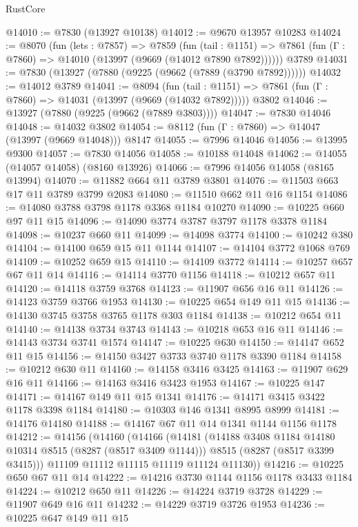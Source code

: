 \begin{lexlean}{RustCore}
\begin{coremodule}
@14010 := @7830 (@13927 @10138)
@14012 := @9670 @13957 @10283
@14024 := @8070
    (fun (lets : @7857) =>
    @7859
      (fun (tail : @1151) =>
      @7861 (fun (Γ : @7860) => @14010 (@13997 (@9669 (@14012 @7890 @7892))))))
    @3789
@14031 := @7830 (@13927 (@7880 (@9225 (@9662 (@7889 (@3790 @7892))))))
@14032 := @14012 @3789
@14041 := @8094
    (fun (tail : @1151) => @7861 (fun (Γ : @7860) => @14031 (@13997 (@9669 (@14032 @7892)))))
    @3802
@14046 := @13927 (@7880 (@9225 (@9662 (@7889 @3803))))
@14047 := @7830 @14046
@14048 := @14032 @3802
@14054 := @8112 (fun (Γ : @7860) => @14047 (@13997 (@9669 @14048))) @8147
@14055 := @7996 @14046
@14056 := @13995 @9300
@14057 := @7830 @14056
@14058 := @10188 @14048
@14062 := @14055 (@14057 @14058) (@8160 @13926)
@14066 := @7996 @14056 @14058 (@8165 @13994)
@14070 := @11882 @664 @11 @3789 @3801
@14076 := @11503 @663 @17 @11 @3789 @3799 @2083
@14080 := @11510 @662 @11 @16 @1154
@14086 := @14080 @3788 @3798 @1178 @3368 @1184 @10270
@14090 := @10225 @660 @97 @11 @15
@14096 := @14090 @3774 @3787 @3797 @1178 @3378 @1184
@14098 := @10237 @660 @11
@14099 := @14098 @3774
@14100 := @10242 @380
@14104 := @14100 @659 @15 @11 @1144
@14107 := @14104 @3772 @1068 @769
@14109 := @10252 @659 @15
@14110 := @14109 @3772
@14114 := @10257 @657 @67 @11 @14
@14116 := @14114 @3770 @1156
@14118 := @10212 @657 @11
@14120 := @14118 @3759 @3768
@14123 := @11907 @656 @16 @11
@14126 := @14123 @3759 @3766 @1953
@14130 := @10225 @654 @149 @11 @15
@14136 := @14130 @3745 @3758 @3765 @1178 @303 @1184
@14138 := @10212 @654 @11
@14140 := @14138 @3734 @3743
@14143 := @10218 @653 @16 @11
@14146 := @14143 @3734 @3741 @1574
@14147 := @10225 @630
@14150 := @14147 @652 @11 @15
@14156 := @14150 @3427 @3733 @3740 @1178 @3390 @1184
@14158 := @10212 @630 @11
@14160 := @14158 @3416 @3425
@14163 := @11907 @629 @16 @11
@14166 := @14163 @3416 @3423 @1953
@14167 := @10225 @147
@14171 := @14167 @149 @11 @15 @1341
@14176 := @14171 @3415 @3422 @1178 @3398 @1184
@14180 := @10303 @146 @1341 @8995 @8999
@14181 := @14176 @14180
@14188 := @14167 @67 @11 @14 @1341 @1144 @1156 @1178
@14212 := @14156
    (@14160
      (@14166
        (@14181
          (@14188 @3408 @1184 @14180 @10314 @8515 (@8287 (@8517 @3409 @1144)))
          @8515
          (@8287 (@8517 @3399 @3415)))
        @11109
        @11112
        @11115
        @11119
        @11124
        @11130))
@14216 := @10225 @650 @67 @11 @14
@14222 := @14216 @3730 @1144 @1156 @1178 @3433 @1184
@14224 := @10212 @650 @11
@14226 := @14224 @3719 @3728
@14229 := @11907 @649 @16 @11
@14232 := @14229 @3719 @3726 @1953
@14236 := @10225 @647 @149 @11 @15

\end{coremodule}
\end{lexlean}
